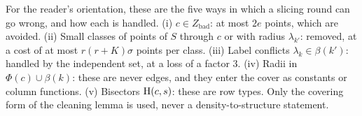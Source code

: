 \begin{remark}
For the reader's orientation, these are the five ways in which a slicing round can go wrong, and how each is
handled. (i) $c\in Z_{\mathrm{bad}}$: at most $2e$ points, which are avoided. (ii) Small classes of points of $S$ through $c$
or with radius $\lambda_{k'}$: removed, at a cost of at most $r(r+K)\sigma$ points per class. (iii) Label conflicts
$\lambda_k\in\beta(k')$: handled by the independent set, at a loss of a factor $3$. (iv) Radii in $\Phi(c)\cup\beta(k)$:
these are never edges, and they enter the cover as constants or column functions. (v) Bisectors $\mathrm{H}(c,s)$: these
are row types. Only the covering form of the cleaning lemma is used, never a density-to-structure statement.
\end{remark}
